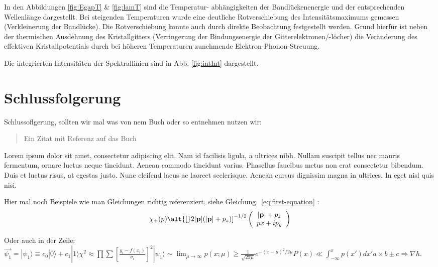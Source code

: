 \documentclass[aps,twocolumn,secnumarabic,nobalancelastpage,amsmath,amssymb,
nofootinbib,superscriptaddress]{revtex4-1}
\begin{document}
\newline\vspace{1em}
\noindent In den Abbildungen \ref{fig:EgapT} \& \ref{fig:lamT} sind die Temperatur-
abhängigkeiten der Bandlückenenergie und der entsprechenden Wellenlänge dargestellt. Bei steigenden Temperaturen wurde eine deutliche
Rotverschiebung des Intensitätsmaximums gemessen (Verkleinerung der Bandlücke). Die Rotverschiebung konnte auch durch
direkte Beobachtung festgestellt werden. Grund hierfür ist neben der thermischen Ausdehnung des Kristallgitters (Verringerung
der Bindungsenergie der Gitterelektronen/-löcher) die Veränderung des effektiven Kristallpotentials durch bei höheren Temperaturen
zunehmende Elektron-Phonon-Streuung. \cite{kittel}

Die integrierten Intensitäten der Spektrallinien sind in Abb. \ref{fig:intInt} dargestellt.


\section{Schlussfolgerung}

Schlussoflgerung, sollten wir mal was von nem Buch oder so entnehmen nutzen wir:


\begin{quote}
  Ein Zitat mit Referenz auf das Buch \cite{melissinos1966}
\end{quote}

Lorem ipsum dolor sit amet, consectetur adipiscing elit. Nam id facilisis ligula,
a ultrices nibh. Nullam suscipit tellus nec mauris fermentum, ornare luctus neque
tincidunt. Aenean commodo tincidunt varius. Phasellus faucibus metus non erat
consectetur bibendum. Duis et luctus risus, at egestas justo. Nunc eleifend lacus
ac laoreet scelerisque. Aenean cursus dignissim magna in ultrices. In eget nisl
quis nisi.

Hier mal noch Beispiele wie man Gleichungen richtig referenziert, siehe
Gleichung.~\ref{eq:first-equation} :
\begin{equation}
   \chi_+(p)\alt{\bf [}2|{\bf p}|(|{\bf p}|+p_z){\bf ]}^{-1/2}
   \left(
   \begin{array}{c}
      |{\bf p}|+p_z\\
      px+ip_y
   \end{array}\right)
   \label{eq:first-equation}
\end{equation}


Oder auch in der Zeile: $\vec{\psi_1} = |\psi_1\rangle \equiv c_0|0\rangle +
c_1|1\rangle \chi^2 \approx
\prod\sum\left[\frac{y_i-f(x_i)}{\sigma_i}\right]^2 |\psi_1\rangle
\sim \lim_{\mu \rightarrow \infty}p(x;\mu) \geq \frac{1}{\sqrt{2 \pi
\mu}} e^{-(x-\mu)^2 / 2\mu}P(x) \ll \int_{-\infty}^x p(x')dx'a
\times b \pm c \Rightarrow \nabla \hbar$.
\end{document}
